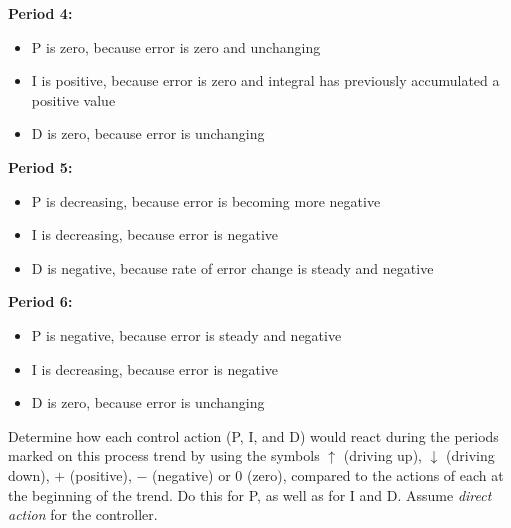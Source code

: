 {\bf Period 4:}
 

\begin{itemize}
\item{}P is zero, because error is zero and unchanging
\item{}I is positive, because error is zero and integral has previously accumulated a positive value
\item{}D is zero, because error is unchanging
\end{itemize} 
\bigskip 
 

{\bf Period 5:}

\begin{itemize}
\item{}P is decreasing, because error is becoming more negative
\item{}I is decreasing, because error is negative
\item{}D is negative, because rate of error change is steady and negative
\end{itemize} 
\bigskip 
 

{\bf Period 6:}
 

\begin{itemize}
\item{}P is negative, because error is steady and negative
\item{}I is decreasing, because error is negative
\item{}D is zero, because error is unchanging
\end{itemize} 








Determine how each control action (P, I, and D) would react during the periods marked on this process trend by using the symbols $\uparrow$ (driving up), $\downarrow$ (driving down), $+$ (positive), $-$ (negative) or 0 (zero), compared to the actions of each at the beginning of the trend.  Do this for P, as well as for I and D.  Assume {\it direct action} for the controller.

